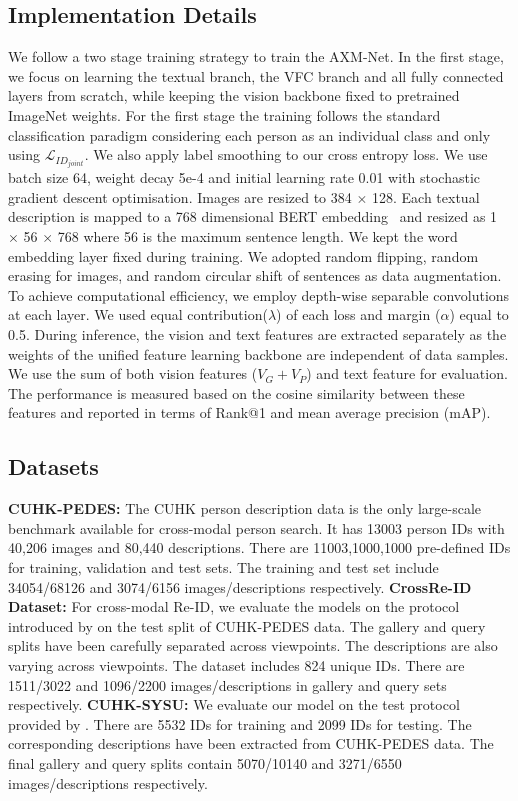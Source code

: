 \documentclass[letterpaper]{article} \usepackage{aaai22}  \usepackage{times}  \usepackage{helvet}  \usepackage{courier}  \usepackage[hyphens]{url}  \usepackage{graphicx} \urlstyle{rm} \def\UrlFont{\rm}  \usepackage{natbib}  \usepackage{caption} \DeclareCaptionStyle{ruled}{labelfont=normalfont,labelsep=colon,strut=off} \frenchspacing  \setlength{\pdfpagewidth}{8.5in}  \setlength{\pdfpageheight}{11in}  \usepackage{algorithm}
\begin{document}
\subsection{Implementation Details}
We follow a two stage training strategy to train the AXM-Net. In the first stage, we focus on learning the textual branch, the VFC branch and all fully connected layers from scratch, while keeping the vision backbone fixed to pretrained ImageNet weights. For the first stage the training follows the standard classification paradigm considering each person as an individual class and only using $\mathcal{L}_{ID_{joint}}$. We also apply label smoothing to our cross entropy loss. We use batch size 64, weight decay 5e-4 and initial learning rate 0.01 with stochastic gradient descent optimisation. Images are resized to 384 $\times$ 128. Each textual description is mapped to a 768 dimensional BERT embedding~\cite{devlin2018bert} and resized as 1 $\times$ 56 $\times$ 768 where 56 is the maximum sentence length. We kept the word embedding layer fixed during training.
We adopted random flipping, random erasing for images, and random circular shift of sentences as data augmentation. To achieve computational efficiency, we employ depth-wise separable convolutions at each layer. We used equal contribution($\lambda$) of each loss and margin ($\alpha$) equal to 0.5.
During inference, the vision and text features are extracted separately as the weights of the unified feature learning backbone are independent of data samples. We use the sum of both vision features ($V_{G} + V_{P}$) and text feature for evaluation. The performance is measured based on the cosine similarity between these features and reported in terms of Rank@1 and mean average precision ({m}AP).

\subsection{Datasets}
\noindent\textbf{CUHK-PEDES:}
The CUHK person description data \cite{li2017person} is the only large-scale benchmark available for cross-modal person search. It has 13003 person IDs with 40,206 images and 80,440 descriptions. There are 11003,1000,1000 pre-defined IDs for training, validation and test sets. The training and test set include 34054/68126 and 3074/6156 images/descriptions respectively. 
\noindent\textbf{CrossRe-ID Dataset:}
For cross-modal Re-ID, we evaluate the models on the protocol introduced by \cite{farooq2020IJCB} on the test split of CUHK-PEDES data. The gallery and query splits have been carefully separated across viewpoints. The descriptions are also varying across viewpoints. The dataset includes 824 unique IDs. There are 1511/3022 and 1096/2200 images/descriptions in gallery and query sets respectively. 
\noindent\textbf{CUHK-SYSU:}
We evaluate our model on the test protocol provided by \cite{farooq2020convolutional}. 
There are 5532 IDs for training and 2099 IDs for testing. The corresponding descriptions have been extracted from CUHK-PEDES data. The final gallery and query splits contain 5070/10140 and 3271/6550 images/descriptions respectively.
\end{document}
